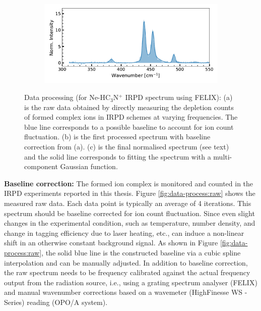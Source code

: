 \begin{figure}[!htb]
    \hfill
    \begin{subfigure}[b]{0.45\textwidth}
        \centering
        \includegraphics[width=1\textwidth]{figures/IR-data-norm/normalised.pdf}
        \caption{}
        \label{fig:data-process:normalised}
    \end{subfigure}
    
    \caption{Data processing (for Ne-HC$_3$N$^+$ IRPD spectrum using FELIX): (a) is the raw data obtained by directly measuring the depletion counts of formed complex ions in IRPD schemes at varying frequencies. The blue line corresponds to a possible baseline to account for ion count fluctuation. (b) is the first processed spectrum with baseline correction from (a). (c) is the final normalised spectrum (see text) and the solid line corresponds to fitting the spectrum with a multi-component Gaussian function.}
    \label{fig:data-process}
\end{figure}

\textbf{Baseline correction:} The formed ion complex is monitored and counted in the IRPD experiments reported in this thesis. Figure \ref{fig:data-process:raw} shows the measured raw data. Each data point is typically an average of 4 iterations. This spectrum should be baseline corrected for ion count fluctuation. Since even slight changes in the experimental condition, such as temperature, number density, and change in tagging efficiency due to laser heating, etc., can induce a non-linear shift in an otherwise constant background signal. As shown in Figure \ref{fig:data-process:raw}, the solid blue line is the constructed baseline via a cubic spline interpolation and can be manually adjusted. In addition to baseline correction, the raw spectrum needs to be frequency calibrated against the actual frequency output from the radiation source, i.e., using a grating spectrum analyser (FELIX) and manual wavenumber corrections based on a wavemeter (HighFinesse WS - Series) reading (OPO/A system).\\

